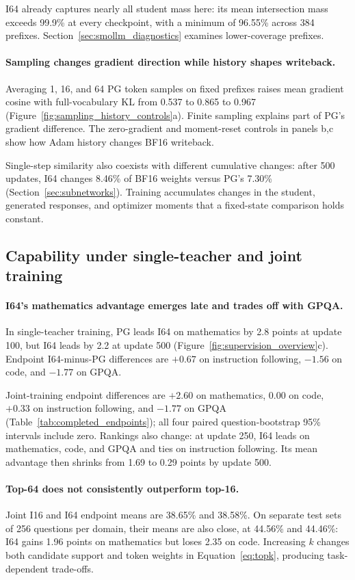 

I64 already captures nearly all student mass here: its mean intersection mass exceeds 99.9\% at every checkpoint, with a minimum of 96.55\% across 384 prefixes. Section~\ref{sec:smollm_diagnostics} examines lower-coverage prefixes.

\paragraph{Sampling changes gradient direction while history shapes writeback.}
Averaging 1, 16, and 64 PG token samples on fixed prefixes raises mean gradient cosine with full-vocabulary KL from 0.537 to 0.865 to 0.967 (Figure~\ref{fig:sampling_history_controls}a). Finite sampling explains part of PG's gradient difference. The zero-gradient and moment-reset controls in panels b,c show how Adam history changes BF16 writeback.



Single-step similarity also coexists with different cumulative changes: after 500 updates, I64 changes 8.46\% of BF16 weights versus PG's 7.30\% (Section~\ref{sec:subnetworks}). Training accumulates changes in the student, generated responses, and optimizer moments that a fixed-state comparison holds constant.

\subsection{Capability under single-teacher and joint training}

\paragraph{I64's mathematics advantage emerges late and trades off with GPQA.}
In single-teacher training, PG leads I64 on mathematics by 2.8 points at update 100, but I64 leads by 2.2 at update 500 (Figure~\ref{fig:supervision_overview}c). Endpoint I64-minus-PG differences are $+0.67$ on instruction following, $-1.56$ on code, and $-1.77$ on GPQA.

Joint-training endpoint differences are $+2.60$ on mathematics, $0.00$ on code, $+0.33$ on instruction following, and $-1.77$ on GPQA (Table~\ref{tab:completed_endpoints}); all four paired question-bootstrap 95\% intervals include zero. Rankings also change: at update 250, I64 leads on mathematics, code, and GPQA and ties on instruction following. Its mean advantage then shrinks from 1.69 to 0.29 points by update 500.

\paragraph{Top-64 does not consistently outperform top-16.}
Joint I16 and I64 endpoint means are 38.65\% and 38.58\%. On separate test sets of 256 questions per domain, their means are also close, at 44.56\% and 44.46\%: I64 gains 1.96 points on mathematics but loses 2.35 on code. Increasing $k$ changes both candidate support and token weights in Equation~\ref{eq:topk}, producing task-dependent trade-offs.


